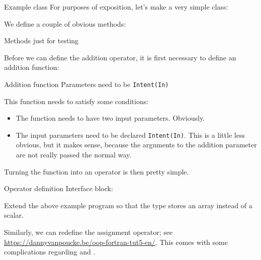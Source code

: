 \begin{block}{Example class}
  \label{sl:foverload1}
  For purposes of exposition, let's make a very simple class:
\end{block}

We define a couple of obvious methods:
\begin{block}{Methods just for testing}
  \label{sl:foverload2}
  \begin{multicols}{2}
  \end{multicols}
\end{block}

Before we can define the addition operator,
it is first necessary to define an addition function:

\begin{slide}{Addition function}
  \label{sl:foverload3}
  Parameters need to be \lstinline+Intent(In)+
\end{slide}

This function needs to satisfy some conditions:
\begin{itemize}
\item The function needs to have two input parameters. Obviously.
\item The input parameters need to be declared \lstinline+Intent(In)+.
  This is a little less obvious, but it makes sense,
  because the arguments to the addition parameter are not really
  passed the normal way.
\end{itemize}

Turning the function into an operator is then pretty simple.
\begin{block}{Operator definition}
  \label{sl:field-op}
  Interface block:
\end{block}

\begin{exercise}
  \label{ex:field-op}
  Extend the above example program so that the type stores
  an array instead of a scalar.
\end{exercise}

Similarly, we can redefine the assignment operator;
see \url{https://dannyvanpoucke.be/oop-fortran-tut5-en/}.
This comes with some complications regarding
 and .
